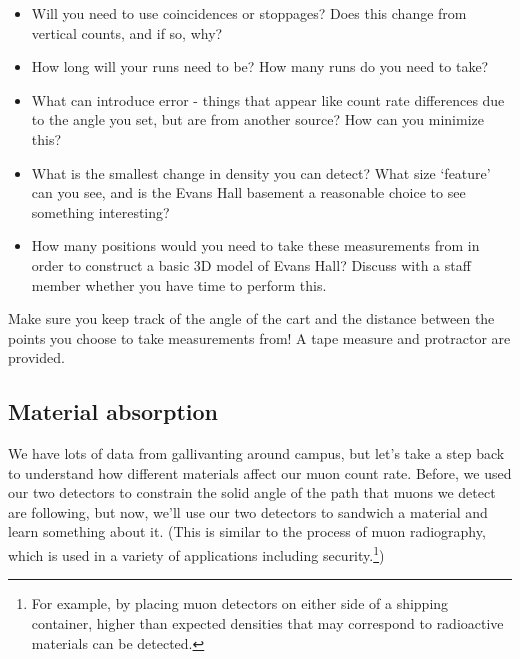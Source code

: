 \documentclass{../lab}
\begin{document}
\begin{itemize}
    \item Will you need to use coincidences or stoppages? Does this change from vertical counts, and if so, why?
    \item How long will your runs need to be? How many runs do you need to take?
    \item What can introduce error - things that appear like count rate differences due to the angle you set, but are from another source? How can you minimize this?
    \item What is the smallest change in density you can detect? What size `feature' can you see, and is the Evans Hall basement a reasonable choice to see something interesting?
    \item How many positions would you need to take these measurements from in order to construct a basic 3D model of Evans Hall? Discuss with a staff member whether you have time to perform this.
\end{itemize}

Make sure you keep track of the angle of the cart and the distance between the points you choose to take measurements from! A tape measure and protractor are provided.



\subsection{Material absorption}

We have lots of data from gallivanting around campus, but let's take a step back to understand how different materials affect our muon count rate. Before, we used our two detectors to constrain the solid angle of the path that muons we detect are following, but now, we'll use our two detectors to sandwich a material and learn something about it. (This is similar to the process of muon radiography, which is used in a variety of applications including security.\footnote{For example, by placing muon detectors on either side of a shipping container, higher than expected densities that may correspond to radioactive materials can be detected.})
\end{document}

